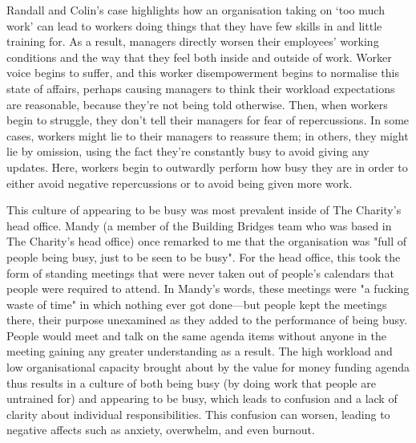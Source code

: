 Randall and Colin's case highlights how an organisation taking on `too much work' can lead to workers doing things that they have few skills in and little training for. As a result, managers directly worsen their employees' working conditions and the way that they feel both inside and outside of work. Worker voice begins to suffer, and this worker disempowerment begins to normalise this state of affairs, perhaps causing managers to think their workload expectations are reasonable, because they're not being told otherwise. Then, when workers begin to struggle, they don't tell their managers for fear of repercussions. In some cases, workers might lie to their managers to reassure them; in others, they might lie by omission, using the fact they're constantly busy to avoid giving any updates. Here, workers begin to outwardly perform how busy they are in order to either avoid negative repercussions or to avoid being given more work. 

This culture of appearing to be busy was most prevalent inside of The Charity’s head office. Mandy (a member of the Building Bridges team who was based in The Charity's head office) once remarked to me that the organisation was "full of people being busy, just to be seen to be busy". For the head office, this took the form of standing meetings that were never taken out of people's calendars that people were required to attend. In Mandy's words, these meetings were "a fucking waste of time" in which nothing ever got done—but people kept the meetings there, their purpose unexamined as they added to the performance of being busy. People would meet and talk on the same agenda items without anyone in the meeting gaining any greater understanding as a result. The high workload and low organisational capacity brought about by the value for money funding agenda thus results in a culture of both being busy (by doing work that people are untrained for) and appearing to be busy, which leads to confusion and a lack of clarity about individual responsibilities. This confusion can worsen, leading to negative affects such as anxiety, overwhelm, and even burnout. 

